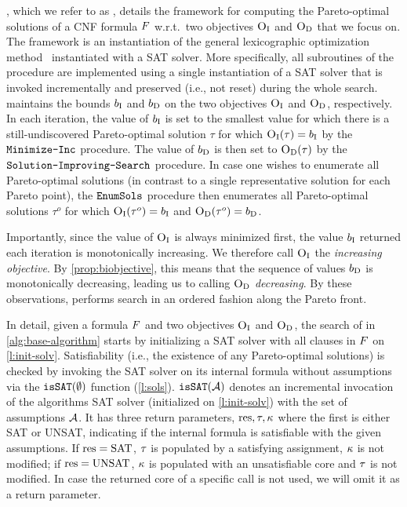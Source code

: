 , which we refer to as \algname{}, details the  framework for computing the Pareto-optimal solutions of a CNF formula $F$ w.r.t.\ two objectives $\textsc{O}_{\text{I}}$ and $\textsc{O}_{\text{D}}$ that we focus on.
The framework is an instantiation of the general lexicographic optimization method~\autocite{survey} instantiated with a SAT solver.
More specifically, all subroutines of the procedure are implemented using a single instantiation of a SAT solver that is invoked incrementally and preserved (i.e., not reset) during the whole search. 
\algname{} maintains the bounds $b_{\text{I}}$ and $b_{\text{D}}$ on the two objectives $\textsc{O}_{\text{I}}$ and $\textsc{O}_{\text{D}}$, respectively.
In each iteration, the value of $b_{\text{I}}$ is set to the smallest value for which there is a still-undiscovered Pareto-optimal solution $\tau$ for which $\textsc{O}_{\text{I}}(\tau) = b_{\text{I}}$ by the $\texttt{Minimize-\allowbreak{}Inc}$ procedure.
The value of $b_{\text{D}}$ is then set to $\textsc{O}_{\text{D}}(\tau)$ by the $\texttt{Solution-\allowbreak{}Improving-\allowbreak{}Search}$ procedure.
In case one wishes to enumerate all Pareto-optimal solutions (in contrast to a single representative solution for each Pareto point), the $\texttt{EnumSols}$ procedure then enumerates all Pareto-optimal solutions $\tau^o$ for which $\textsc{O}_{\text{I}}(\tau^o) = b_{\text{I}}$ and $\textsc{O}_{\text{D}}(\tau^o) = b_{\text{D}}$.

Importantly, since the value of $\textsc{O}_{\text{I}}$ is always minimized first, the value $b_{\text{I}}$ returned each iteration is monotonically increasing. 
We therefore call $\textsc{O}_{\text{I}}$ the \emph{increasing objective}.
By \cref{prop:biobjective}, this means that the sequence of values $b_{\text{D}}$ is monotonically decreasing, leading us to calling $\textsc{O}_{\text{D}}$ \emph{decreasing}.
By these observations, \algname{} performs search in an ordered fashion along the Pareto front.

In detail, given a formula $F$ and two objectives $\textsc{O}_{\text{I}}$ and $\textsc{O}_{\text{D}}$, the search of \algname{} in \cref{alg:base-algorithm} starts by initializing a SAT solver with all clauses in $F$ on \cref{l:init-solv}.
Satisfiability (i.e., the existence of any Pareto-optimal solutions) is checked by invoking the SAT solver on its internal formula without assumptions via the $\texttt{isSAT}(\emptyset)$ function (\cref{l:sols}).
$\texttt{isSAT}(\mathcal{A})$ denotes an incremental invocation of the algorithms SAT solver (initialized on \cref{l:init-solv}) with the set of assumptions $\mathcal{A}$.
It has three return parameters, $\text{res},\tau,\kappa$ where the first is either SAT or UNSAT, indicating if the internal formula is satisfiable with the given assumptions.
If $\text{res}=\text{SAT}$, $\tau$ is populated by a satisfying assignment, $\kappa$ is not modified;
if $\text{res}=\text{UNSAT}$, $\kappa$ is populated with an unsatisfiable core and $\tau$ is not modified.
In case the returned core of a specific call is not used, we will omit it as a return parameter.


